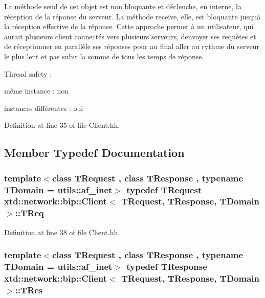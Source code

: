 La méthode send de cet objet est non bloquante et déclenche, en interne, la réception de la réponse du serveur. La méthode receive, elle, est bloquante jusqu\textquotesingle{}à la réception effective de la réponse. Cette approche permet à un utilisateur, qui aurait plusieurs client connectés vers plusieurs serveurs, d\textquotesingle{}envoyer ses requètes et de réceptionner en parallèle ses réponses pour au final aller au rythme du serveur le plus lent et pas subir la somme de tous les temps de réponse.

Thread safety \+:
\begin{DoxyItemize}
\item même instance \+: non
\item instances différentes \+: oui 
\end{DoxyItemize}

Definition at line 35 of file Client.\+hh.



\subsection{Member Typedef Documentation}
\subsubsection[{\texorpdfstring{T\+Req}{TReq}}]{\setlength{\rightskip}{0pt plus 5cm}template$<$class T\+Request , class T\+Response , typename T\+Domain  = utils\+::af\+\_\+inet$>$ typedef T\+Request {\bf xtd\+::network\+::bip\+::\+Client}$<$ T\+Request, T\+Response, T\+Domain $>$\+::{\bf T\+Req}}\hypertarget{classxtd_1_1network_1_1bip_1_1Client_a4fd207d42e4738c5aa2f6ca947067be4}{}\label{classxtd_1_1network_1_1bip_1_1Client_a4fd207d42e4738c5aa2f6ca947067be4}


Definition at line 38 of file Client.\+hh.

\subsubsection[{\texorpdfstring{T\+Res}{TRes}}]{\setlength{\rightskip}{0pt plus 5cm}template$<$class T\+Request , class T\+Response , typename T\+Domain  = utils\+::af\+\_\+inet$>$ typedef T\+Response {\bf xtd\+::network\+::bip\+::\+Client}$<$ T\+Request, T\+Response, T\+Domain $>$\+::{\bf T\+Res}}\hypertarget{classxtd_1_1network_1_1bip_1_1Client_a1fc57254a811008a795987c49c222e77}{}\label{classxtd_1_1network_1_1bip_1_1Client_a1fc57254a811008a795987c49c222e77}


